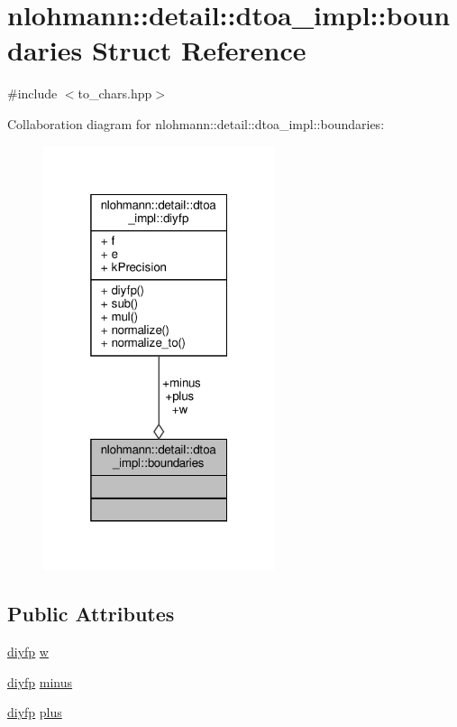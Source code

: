 \hypertarget{structnlohmann_1_1detail_1_1dtoa__impl_1_1boundaries}{}\section{nlohmann\+:\+:detail\+:\+:dtoa\+\_\+impl\+:\+:boundaries Struct Reference}
\label{structnlohmann_1_1detail_1_1dtoa__impl_1_1boundaries}


{\ttfamily \#include $<$to\+\_\+chars.\+hpp$>$}



Collaboration diagram for nlohmann\+:\+:detail\+:\+:dtoa\+\_\+impl\+:\+:boundaries\+:
\nopagebreak
\begin{figure}[H]
\begin{center}
\leavevmode
\includegraphics[width=193pt]{structnlohmann_1_1detail_1_1dtoa__impl_1_1boundaries__coll__graph}
\end{center}
\end{figure}
\subsection*{Public Attributes}
\begin{DoxyCompactItemize}
\item 
\hyperlink{structnlohmann_1_1detail_1_1dtoa__impl_1_1diyfp}{diyfp} \hyperlink{structnlohmann_1_1detail_1_1dtoa__impl_1_1boundaries_ad1668c60aeade5f2557fafed8b8aee1a}{w}
\item 
\hyperlink{structnlohmann_1_1detail_1_1dtoa__impl_1_1diyfp}{diyfp} \hyperlink{structnlohmann_1_1detail_1_1dtoa__impl_1_1boundaries_aec4e5028333c01f3229062f31ce16763}{minus}
\item 
\hyperlink{structnlohmann_1_1detail_1_1dtoa__impl_1_1diyfp}{diyfp} \hyperlink{structnlohmann_1_1detail_1_1dtoa__impl_1_1boundaries_a3321ae2816a6ec5250a0d8e29f798232}{plus}
\end{DoxyCompactItemize}


